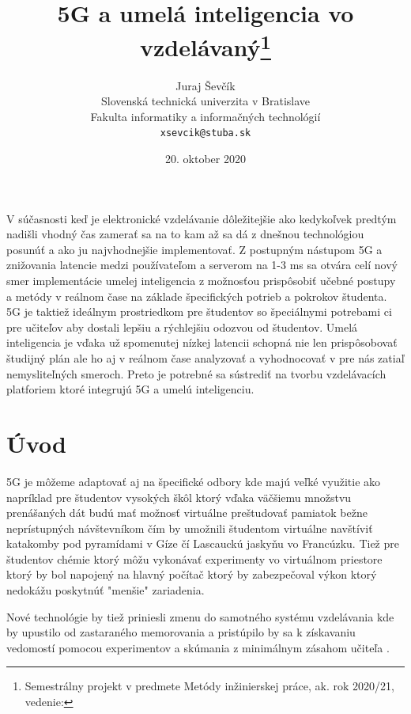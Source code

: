 \documentclass[10pt,oneside,slovak,a4paper]{article}
\title{5G a umelá inteligencia vo vzdelávaný\thanks{Semestrálny projekt v predmete Metódy inžinierskej práce, ak. rok 2020/21, vedenie:}}
\author{Juraj Ševčík\\[2pt]
	{\small Slovenská technická univerzita v Bratislave}\\
	{\small Fakulta informatiky a informačných technológií}\\
	{\small \texttt{xsevcik@stuba.sk}}
}
\date{\small 20. oktober 2020}
\begin{document}
\maketitle

\begin{abstract}


\end{abstract}
V súčasnosti  keď je elektronické vzdelávanie dôležitejšie ako kedykoľvek predtým nadišli vhodný čas zamerať sa na to kam až sa dá z dnešnou technológiou posunúť a ako ju najvhodnejšie implementovať. Z postupným nástupom 5G a znižovania latencie medzi používateľom a serverom na 1-3 ms sa otvára celí nový smer implementácie umelej inteligencia z možnosťou prispôsobiť učebné postupy a metódy v reálnom čase na základe špecifických potrieb a pokrokov študenta.  5G je taktiež ideálnym prostriedkom pre študentov so špeciálnymi potrebami ci pre učiteľov aby dostali lepšiu a rýchlejšiu odozvou od študentov.
Umelá inteligencia je vďaka už spomenutej nízkej latencii schopná nie len prispôsobovať študijný plán ale ho aj v reálnom čase analyzovať  a vyhodnocovať v pre nás zatiaľ nemysliteľných smeroch. Preto je potrebné sa sústrediť na tvorbu vzdelávacích platforiem ktoré integrujú 5G a umelú inteligenciu.

\newpage
\section{Úvod}



5G je môžeme adaptovať aj na špecifické odbory kde majú veľké využitie ako napríklad pre študentov vysokých škôl ktorý vďaka väčšiemu množstvu prenášaných dát budú mať možnosť virtuálne preštudovať pamiatok bežne neprístupných návštevníkom čím by umožnili študentom virtuálne navštíviť katakomby pod pyramídami v Gíze čí Lascauckú jaskyňu vo Francúzku. Tiež pre študentov chémie ktorý môžu vykonávať experimenty vo virtuálnom priestore ktorý by bol napojený na hlavný počítač ktorý by zabezpečoval výkon ktorý nedokážu poskytnúť "menšie" zariadenia. 

Nové technológie by tiež priniesli zmenu do samotného systému vzdelávania kde by upustilo od zastaraného memorovania a pristúpilo by sa k získavaniu vedomostí pomocou experimentov a skúmania z minimálnym zásahom učiteľa
.\cite{Opincariu2019EDUCATIONIT}
\end{document}
